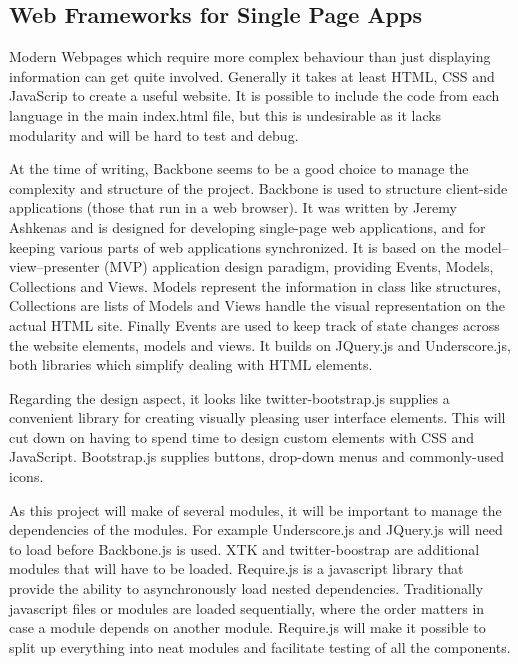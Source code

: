 \documentclass[a4paper,11pt,titlepage]{article}
\begin{document}
\subsection{Web Frameworks for Single Page Apps}


Modern Webpages which require more complex behaviour than just displaying information can get quite involved. Generally it takes at least HTML, CSS and JavaScrip to create a useful website. It is possible to include the code from each language in the main index.html file, but this is undesirable as it lacks modularity and will be hard to test and debug.

At the time of writing, Backbone seems to be a good choice to manage the complexity and structure of the project. Backbone is used to structure client-side applications (those that run in a web browser). It was written by Jeremy Ashkenas and is designed for developing single-page web applications, and for keeping various parts of web applications synchronized. It is based on the model–view–presenter (MVP) application design paradigm, providing Events, Models, Collections and Views. Models represent the information in class like structures, Collections are lists of Models and Views handle the visual representation on the actual HTML site. Finally Events are used to keep track of state changes across the website elements, models and views. It builds on JQuery.js and Underscore.js, both libraries which simplify dealing with HTML elements.

Regarding the design aspect, it looks like twitter-bootstrap.js supplies a convenient library for creating visually pleasing user interface elements. This will cut down on having to spend time to design custom elements with CSS and JavaScript. Bootstrap.js supplies buttons, drop-down menus and commonly-used icons.

As this project will make of several modules, it will be important to manage the dependencies of the modules. For example Underscore.js and JQuery.js will need to load before Backbone.js is used. XTK and twitter-boostrap are additional modules that will have to be loaded. Require.js is a javascript library that provide the ability to asynchronously load nested dependencies. Traditionally javascript files or modules are loaded sequentially, where the order matters in case a module depends on another module. Require.js will make it possible to split up everything into neat modules and facilitate testing of all the components.
\end{document}
